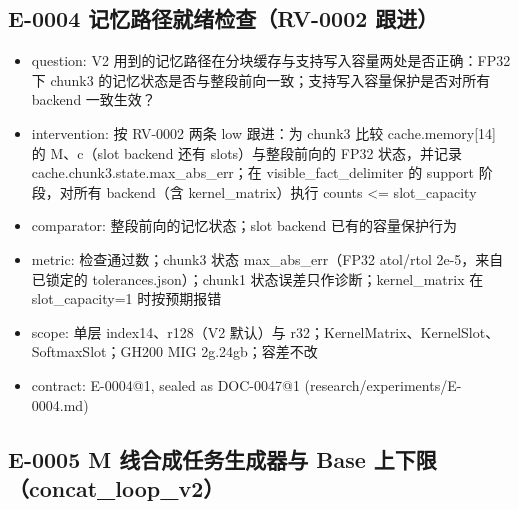 \documentclass[11pt]{article}
\begin{document}
\subsection*{E-0004 记忆路径就绪检查（RV-0002 跟进）}

\begin{itemize}
\item question: V2 用到的记忆路径在分块缓存与支持写入容量两处是否正确：FP32 下 chunk3 的记忆状态是否与整段前向一致；支持写入容量保护是否对所有 backend 一致生效？
\item intervention: 按 RV-0002 两条 low 跟进：为 chunk3 比较 cache.memory[14] 的 M、c（slot backend 还有 slots）与整段前向的 FP32 状态，并记录 cache.chunk3.state.max\_abs\_err；在 visible\_fact\_delimiter 的 support 阶段，对所有 backend（含 kernel\_matrix）执行 counts \textless{}= slot\_capacity
\item comparator: 整段前向的记忆状态；slot backend 已有的容量保护行为
\item metric: 检查通过数；chunk3 状态 max\_abs\_err（FP32 atol/rtol 2e-5，来自已锁定的 tolerances.json）；chunk1 状态误差只作诊断；kernel\_matrix 在 slot\_capacity=1 时按预期报错
\item scope: 单层 index14、r128（V2 默认）与 r32；KernelMatrix、KernelSlot、SoftmaxSlot；GH200 MIG 2g.24gb；容差不改
\item contract: E-0004@1, sealed as DOC-0047@1 (research/experiments/E-0004.md)
\end{itemize}

\subsection*{E-0005 M 线合成任务生成器与 Base 上下限（concat\_loop\_v2）}
\end{document}
